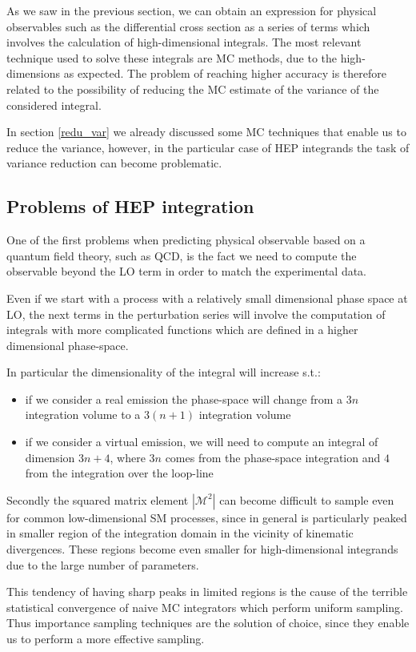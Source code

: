 \documentclass[../main/main.tex]{subfiles}
\begin{document}
As we saw in the previous section, we can obtain an expression for physical observables such as the differential cross section as a series of terms which involves the calculation of high-dimensional integrals. The most relevant technique used to solve these integrals are MC methods, due to the high-dimensions as expected. The problem of reaching higher accuracy is therefore related 
to the possibility of reducing the MC estimate of the variance of the considered integral.

In section \ref{redu_var} we already discussed some MC techniques that enable us to reduce the variance, however, in the particular case of HEP integrands the task of variance reduction can become problematic.

\subsection{Problems of HEP integration}
One of the first problems when predicting physical observable based on a quantum field theory, such as QCD, is the fact we need to compute the observable beyond the LO term in order to match the experimental data. 

Even if we start with a process with a relatively small dimensional phase space  at LO, the next terms in the perturbation series will involve the computation of integrals with more complicated functions which are defined in a higher dimensional phase-space.

In particular the dimensionality of the integral will increase s.t.:
\begin{itemize}
	\item if we consider a real emission  the phase-space will change from a $3 n$ integration volume to a $3(n+1)$ integration volume
	\item if we consider a virtual emission, we will need to compute an integral of dimension $3n +4$, where $3n$ comes from the phase-space integration and $4$ from the integration over the loop-line
\end{itemize}

Secondly the squared matrix element $|\mathcal{M}^2|$ can become difficult to sample even for common low-dimensional SM processes, since 
in general is particularly peaked in smaller region of the integration domain in the vicinity of kinematic divergences. These regions become even smaller for high-dimensional integrands due to the large number of parameters.

This tendency of having sharp peaks in limited regions is the cause of the terrible statistical convergence of naive MC integrators which 
perform uniform sampling. Thus importance sampling techniques are the solution of choice, since they enable us to perform a more effective 
sampling.
\end{document}
